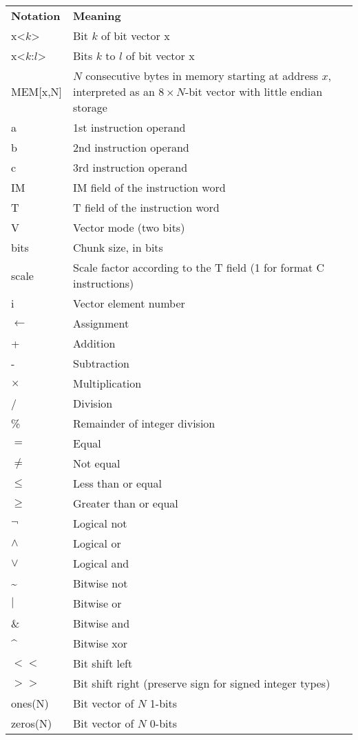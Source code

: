 \begin{tabular}{lp{170pt}}
\textbf{Notation} & \textbf{Meaning} \\
x<$k$> & Bit $k$ of bit vector x \\
x<$k$:$l$> & Bits $k$ to $l$ of bit vector x \\
MEM[x,N] & $N$ consecutive bytes in memory starting at address $x$, interpreted as an $8\times N$-bit vector with little endian storage \\
a & 1st instruction operand \\
b & 2nd instruction operand \\
c & 3rd instruction operand \\
IM & IM field of the instruction word \\
T & T field of the instruction word \\
V & Vector mode (two bits) \\
bits & Chunk size, in bits \\
scale & Scale factor according to the T field (1 for format C instructions) \\
i & Vector element number \\
$\leftarrow$ & Assignment \\
+ & Addition \\
- & Subtraction \\
$\times$ & Multiplication \\
/ & Division \\
\% & Remainder of integer division \\
$=$ & Equal \\
$\neq$ & Not equal \\
$\leq$ & Less than or equal \\
$\geq$ & Greater than or equal \\
$\neg$ & Logical not \\
$\wedge$ & Logical or \\
$\vee$ & Logical and \\
\textasciitilde & Bitwise not \\
$|$ & Bitwise or \\
\& & Bitwise and \\
\textasciicircum & Bitwise xor \\
$<<$ & Bit shift left \\
$>>$ & Bit shift right (preserve sign for signed integer types) \\
ones(N) & Bit vector of $N$ 1-bits \\
zeros(N) & Bit vector of $N$ 0-bits \\

\end{tabular}
